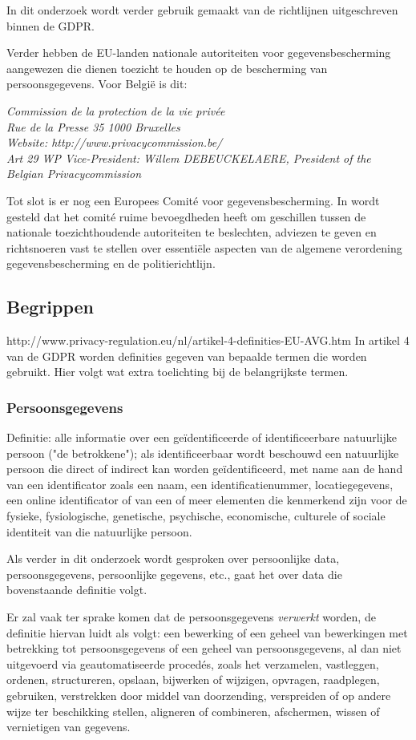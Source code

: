 In dit onderzoek wordt verder gebruik gemaakt van de richtlijnen uitgeschreven binnen de GDPR. 

Verder hebben de EU-landen nationale autoriteiten voor gegevensbescherming aangewezen die dienen toezicht te houden op de bescherming van persoonsgegevens. Voor België is dit: 

\textit{Commission de la protection de la vie privée \\  Rue de la Presse 35 1000 Bruxelles \\  Website: http://www.privacycommission.be/ \\ 
    Art 29 WP Vice-President: Willem DEBEUCKELAERE, President of the Belgian Privacycommission} 

Tot slot is er nog een Europees Comité voor gegevensbescherming. In \textcite{Eucom2018} wordt gesteld dat het comité ruime bevoegdheden heeft om geschillen tussen de nationale toezichthoudende autoriteiten te beslechten, adviezen te geven en richtsnoeren vast te stellen over essentiële aspecten van de algemene verordening gegevensbescherming en de politierichtlijn.

\subsection{{Begrippen}}
http://www.privacy-regulation.eu/nl/artikel-4-definities-EU-AVG.htm
In artikel 4 van de GDPR worden definities gegeven van bepaalde termen die worden gebruikt. Hier volgt wat extra toelichting bij de belangrijkste termen. 

\subsubsection{Persoonsgegevens} 
Definitie: alle informatie over een geïdentificeerde of identificeerbare natuurlijke persoon ("de betrokkene"); als identificeerbaar wordt beschouwd een natuurlijke persoon die direct of indirect kan worden geïdentificeerd, met name aan de hand van een identificator zoals een naam, een identificatienummer, locatiegegevens, een online identificator of van een of meer elementen die kenmerkend zijn voor de fysieke, fysiologische, genetische, psychische, economische, culturele of sociale identiteit van die natuurlijke persoon.

 Als verder in dit onderzoek wordt gesproken over persoonlijke data, persoonsgegevens, persoonlijke gegevens, etc., gaat het over data die bovenstaande definitie volgt. 

Er zal vaak ter sprake komen dat de persoonsgegevens \textit{verwerkt} worden, de definitie hiervan luidt als volgt: een bewerking of een geheel van bewerkingen met betrekking tot persoonsgegevens of een geheel van persoonsgegevens, al dan niet uitgevoerd via geautomatiseerde procedés, zoals het verzamelen, vastleggen, ordenen, structureren, opslaan, bijwerken of wijzigen, opvragen, raadplegen, gebruiken, verstrekken door middel van doorzending, verspreiden of op andere wijze ter beschikking stellen, aligneren of combineren, afschermen, wissen of vernietigen van gegevens.


